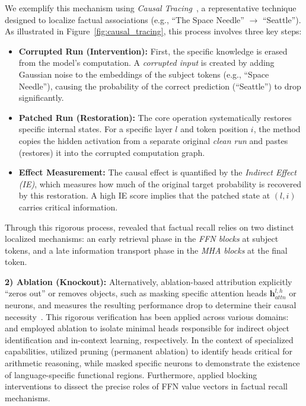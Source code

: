 \documentclass[11pt,letterpaper]{mystyle}
\begin{document}
We exemplify this mechanism using \textit{Causal Tracing}~\citep{meng2022ccs}, a representative technique designed to localize factual associations (e.g., ``The Space Needle'' $\rightarrow$ ``Seattle''). 
As illustrated in Figure~\ref{fig:causal_tracing}, this process involves three key steps:
\begin{itemize}
    \item \textbf{Corrupted Run (Intervention):} First, the specific knowledge is erased from the model's computation. A \textit{corrupted input} is created by adding Gaussian noise to the embeddings of the subject tokens (e.g., ``Space Needle''), causing the probability of the correct prediction (``Seattle'') to drop significantly.
    \item \textbf{Patched Run (Restoration):} The core operation systematically restores specific internal states. For a specific layer $l$ and token position $i$, the method copies the hidden activation from a separate original \textit{clean run} and pastes (restores) it into the corrupted computation graph.
    \item \textbf{Effect Measurement:} The causal effect is quantified by the \textit{Indirect Effect (IE)}, which measures how much of the original target probability is recovered by this restoration. A high IE score implies that the patched state at $(l, i)$ carries critical information.
\end{itemize}
Through this rigorous process, \citet{meng2022ccs} revealed that factual recall relies on two distinct localized mechanisms: an early retrieval phase in the \textit{FFN blocks} at subject tokens, and a late information transport phase in the \textit{MHA blocks} at the final token.

\textbf{2) Ablation (Knockout):} Alternatively, ablation-based attribution explicitly ``zeros out'' or removes objects, such as masking specific attention heads $\mathbf{h}_{attn}^{l,h}$ or neurons, and measures the resulting performance drop to determine their causal necessity~\citep{wang2023interpretability,geva-etal-2023-dissecting,yucausal_emnlp2024,tang-etal-2024-language,yu-ananiadou-2024-interpreting}.
This rigorous verification has been applied across various domains:
\citet{wang2023interpretability} and \citet{yucausal_emnlp2024} employed ablation to isolate minimal heads responsible for indirect object identification and in-context learning, respectively.
In the context of specialized capabilities, \citet{yu-ananiadou-2024-interpreting} utilized pruning (permanent ablation) to identify heads critical for arithmetic reasoning, while \citet{tang-etal-2024-language} masked specific neurons to demonstrate the existence of language-specific functional regions.
Furthermore, \citet{geva-etal-2023-dissecting} applied blocking interventions to dissect the precise roles of FFN value vectors in factual recall mechanisms.
\end{document}
